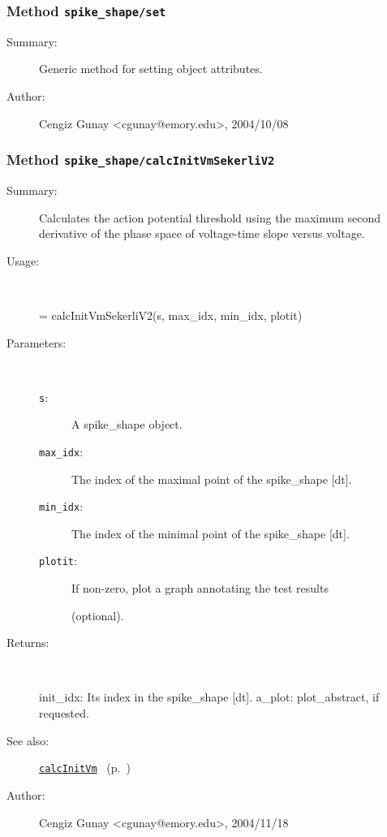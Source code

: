 \subsubsection[Method \texttt{set}]{Method \texttt{spike\_shape/set}}%
%
\label{ref_spike_shape__set}%
\hypertarget{ref_spike_shape__set}{}%
\begin{description}
\item[Summary:]Generic method for setting object attributes.
%
%
%
%
%
%
%
\item[Author:]%
Cengiz Gunay <cgunay@emory.edu>, 2004/10/08%
\end{description}
\methodline%
\subsubsection[Method \texttt{calcInitVmSekerliV2}]{Method \texttt{spike\_shape/calcInitVmSekerliV2}}%
%
\label{ref_spike_shape__calcInitVmSekerliV2}%
\hypertarget{ref_spike_shape__calcInitVmSekerliV2}{}%
\begin{description}
\item[Summary:]Calculates the action potential threshold using the maximum second derivative of the phase space of voltage-time slope versus voltage.
%
\item[Usage:]~%
\begin{lyxcode}%
[init\_idx, a\_plot] = calcInitVmSekerliV2(s, max\_idx, min\_idx, plotit)
%
\end{lyxcode}%
%
%
\item[Parameters:]~
\begin{description}%
\item[\texttt{s}:]
 A spike\_shape object.
\item[\texttt{max\_idx}:]
 The index of the maximal point of the spike\_shape [dt].
\item[\texttt{min\_idx}:]
 The index of the minimal point of the spike\_shape [dt].
\item[\texttt{plotit}:]
 If non-zero, plot a graph annotating the test results 

(optional).\end{description}%
%
\item[Returns:]~

	init\_idx: Its index in the spike\_shape [dt].
	a\_plot: plot\_abstract, if requested.
%
%
\item[See also:]%
\hyperlink{ref_calcInitVm}{\texttt{calcInitVm}}%
\ (p.~\pageref{ref_calcInitVm})%
%
%
\item[Author:]%
Cengiz Gunay <cgunay@emory.edu>, 2004/11/18%
\end{description}
\methodline%
